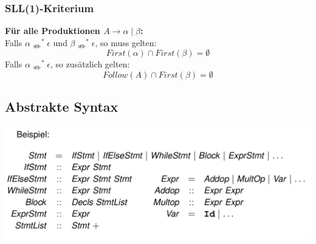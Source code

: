 \subsubsection{SLL(1)-Kriterium}
\textbf{Für alle Produktionen $A \rightarrow \alpha \mid \beta$:}\\
Falls $\alpha \nRightarrow^{*} \epsilon$ und $\beta \nRightarrow^{*} \epsilon$, so muss gelten:
$$First(\alpha) \cap First(\beta) = \emptyset$$
Falls $\alpha \nRightarrow^{*} \epsilon$, so zusätzlich gelten:
$$Follow(A) \cap First(\beta) = \emptyset$$
\subsection{Abstrakte Syntax}
\includegraphics[width=\columnwidth]{images/abstract_syntax.png}